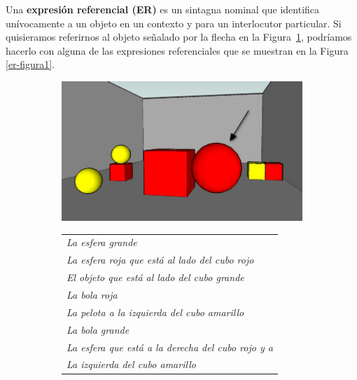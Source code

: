 Una {\bf expresi\'on referencial (ER)} es un sintagna nominal que identifica un\'ivocamente a un objeto en un contexto y para un interlocutor particular. Si quisieramos referirnos al objeto se\~nalado por la flecha en la Figura~\ref{GRE3D7-stimulus1}, podr\'iamos hacerlo con alguna de las expresiones referenciales que se muestran en la Figura \ref{er-figura1}.
\begin{figure}[H]
\begin{subfigure}{.5\textwidth}
  \centering
\includegraphics[width=\textwidth]{images/22sinletras.jpg}
  \caption{}\label{GRE3D7-stimulus1}
\end{subfigure}%
\begin{subfigure}{.5\textwidth}
 \centering

\begin{tabular}{l}
 {\it La esfera grande}\\

 {\it La esfera roja que est\'a al lado del cubo rojo} \\

 {\it El objeto que est\'a al lado del cubo grande}\\

 {\it La bola roja}\\

 {\it La pelota a la izquierda del cubo amarillo}\\

 {\it La bola grande}\\

 {\it La esfera que est\'a a la derecha del cubo rojo y a }\\
{\it La izquierda del cubo amarillo}\\


\end{tabular}
\end{subfigure}
\end{figure}
